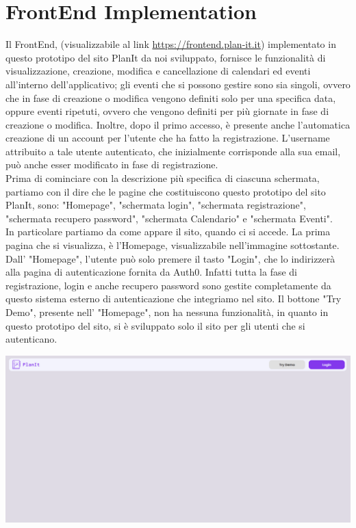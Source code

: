 \section{FrontEnd Implementation}
\label{secD4:FrontEndImplementation}
Il FrontEnd, (visualizzabile al link \href{https://frontend.plan-it.it} {https://frontend.plan-it.it}) implementato in questo prototipo del sito PlanIt da noi sviluppato, fornisce le funzionalità di visualizzazione, creazione, modifica e cancellazione di calendari ed eventi all'interno dell'applicativo; gli eventi che si possono gestire sono sia singoli, ovvero che in fase di creazione o modifica vengono definiti solo per una specifica data, oppure eventi ripetuti, ovvero che vengono definiti per più giornate in fase di creazione o modifica. Inoltre, dopo il primo accesso, è presente anche l'automatica creazione di un account per l'utente che ha fatto la registrazione. L'username attribuito a tale utente autenticato, che inizialmente corrisponde alla sua email, può anche esser modificato in fase di registrazione. \\ Prima di cominciare con la descrizione più specifica di ciascuna schermata, partiamo con il dire che le pagine che costituiscono questo prototipo del sito PlanIt, sono: "Homepage", "schermata login", "schermata registrazione", "schermata recupero password", "schermata Calendario" e "schermata Eventi".
\\ In particolare partiamo da come appare il sito, quando ci si accede. La prima pagina che si visualizza, è l'Homepage, visualizzabile nell'immagine sottostante. Dall' "Homepage", l'utente può solo premere il tasto "Login", che lo indirizzerà alla pagina di autenticazione fornita da Auth0. Infatti tutta la fase di registrazione, login e anche recupero password sono gestite completamente da questo sistema esterno di autenticazione che integriamo nel sito. Il bottone "Try Demo", presente nell' "Homepage", non ha nessuna funzionalità, in quanto in questo prototipo del sito, si è sviluppato solo il sito per gli utenti che si autenticano.
\begin{center}
    \includegraphics[width=1\textwidth, height=0.3\textheight]{img/png/FrontEnd/Homepage_Autenticazione/Homepage.png}
\end{center}
